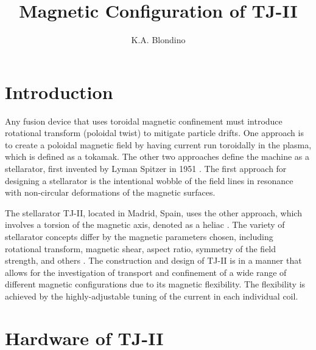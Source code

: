 \documentclass[a4paper]{article}
\author{K.A. Blondino}
\title{Magnetic Configuration of TJ-II}
\begin{document}
\maketitle

\section*{Introduction}
Any fusion device that uses toroidal magnetic confinement must introduce rotational transform (poloidal twist) to mitigate particle drifts.
One approach is to create a poloidal magnetic field by having current run toroidally in the plasma, which is defined as a tokamak.
The other two approaches define the machine as a stellarator, first invented by Lyman Spitzer in 1951 \cite{boozer_what_1998}. 
The first approach for designing a stellarator is the intentional wobble of the field lines in resonance with non-circular deformations of the magnetic surfaces.

The stellarator TJ-II, located in Madrid, Spain, uses the other approach, which involves a torsion of the magnetic axis, denoted as a heliac \cite{boozer_what_1998}.
The variety of stellarator concepts differ by the magnetic parameters chosen, including rotational transform, magnetic shear, aspect ratio, symmetry of the field strength, and others \cite{iaea_fusion_2012}.
The construction and design of TJ-II is in a manner that allows for the investigation of transport and confinement of a wide range of different magnetic configurations due to its magnetic flexibility.
The flexibility is achieved by the highly-adjustable tuning of the current in each individual coil.


\section*{Hardware of TJ-II}
\end{document}
